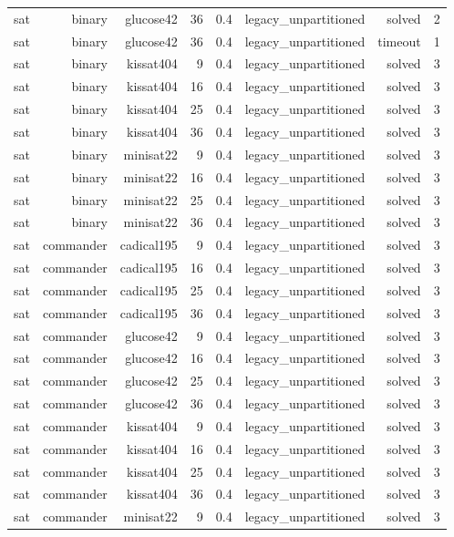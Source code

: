 \begin{tabular}{lrrrrrrr}
sat & binary & glucose42 & 36 & 0.4 & legacy\_unpartitioned & solved & 2 \\
sat & binary & glucose42 & 36 & 0.4 & legacy\_unpartitioned & timeout & 1 \\
sat & binary & kissat404 & 9 & 0.4 & legacy\_unpartitioned & solved & 3 \\
sat & binary & kissat404 & 16 & 0.4 & legacy\_unpartitioned & solved & 3 \\
sat & binary & kissat404 & 25 & 0.4 & legacy\_unpartitioned & solved & 3 \\
sat & binary & kissat404 & 36 & 0.4 & legacy\_unpartitioned & solved & 3 \\
sat & binary & minisat22 & 9 & 0.4 & legacy\_unpartitioned & solved & 3 \\
sat & binary & minisat22 & 16 & 0.4 & legacy\_unpartitioned & solved & 3 \\
sat & binary & minisat22 & 25 & 0.4 & legacy\_unpartitioned & solved & 3 \\
sat & binary & minisat22 & 36 & 0.4 & legacy\_unpartitioned & solved & 3 \\
sat & commander & cadical195 & 9 & 0.4 & legacy\_unpartitioned & solved & 3 \\
sat & commander & cadical195 & 16 & 0.4 & legacy\_unpartitioned & solved & 3 \\
sat & commander & cadical195 & 25 & 0.4 & legacy\_unpartitioned & solved & 3 \\
sat & commander & cadical195 & 36 & 0.4 & legacy\_unpartitioned & solved & 3 \\
sat & commander & glucose42 & 9 & 0.4 & legacy\_unpartitioned & solved & 3 \\
sat & commander & glucose42 & 16 & 0.4 & legacy\_unpartitioned & solved & 3 \\
sat & commander & glucose42 & 25 & 0.4 & legacy\_unpartitioned & solved & 3 \\
sat & commander & glucose42 & 36 & 0.4 & legacy\_unpartitioned & solved & 3 \\
sat & commander & kissat404 & 9 & 0.4 & legacy\_unpartitioned & solved & 3 \\
sat & commander & kissat404 & 16 & 0.4 & legacy\_unpartitioned & solved & 3 \\
sat & commander & kissat404 & 25 & 0.4 & legacy\_unpartitioned & solved & 3 \\
sat & commander & kissat404 & 36 & 0.4 & legacy\_unpartitioned & solved & 3 \\
sat & commander & minisat22 & 9 & 0.4 & legacy\_unpartitioned & solved & 3 \\

\end{tabular}
